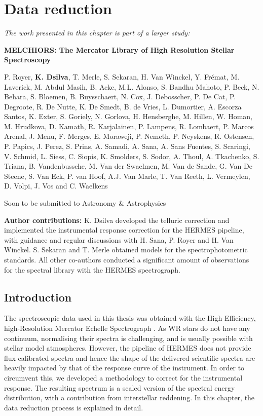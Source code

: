 \chapter{Data reduction} \label{ch:data_reduction}

\textit{The work presented in this chapter is part of a larger study:}

\textbf{MELCHIORS: The Mercator Library of High Resolution Stellar Spectroscopy}

P. Royer, \textbf{K. Dsilva}, T. Merle, S. Sekaran, H. Van Winckel, Y. Fr\'emat, M. Laverick, M. Abdul Masih, B. Acke, M.L. Alonso, S. Bandhu Mahoto, P. Beck, N. Behara, S. Bloemen, B. Buysschaert, N. Cox, J. Debosscher, P. De Cat, P. Degroote, R. De Nutte, K. De Smedt, B. de Vries, L. Dumortier, A. Escorza Santos, K. Exter, S. Goriely, N. Gorlova, H. Hensberghe, M. Hillen, W. Homan, M. Hrudkova, D. Kamath, R. Karjalainen, P. Lampens, R. Lombaert, P. Marcos Arenal, J. Menu, F. Merges, E. Moraweji, P. Nemeth, P. Neyskens, R. Ostensen, P. Papics, J. Perez, S. Prins, A. Samadi, A. Sana, A. Sans Fuentes, S. Scaringi, V. Schmid, L. Siess, C. Siopis, K. Smolders, S. Sodor, A. Thoul, A. Tkachenko, S. Triana, B. Vandenbussche, M. Van der Swaelmen, M. Van de Sande, G. Van De Steene, S. Van Eck, P. van Hoof, A.J. Van Marle, T. Van Reeth, L. Vermeylen, D. Volpi, J. Vos and C. Waelkens

Soon to be submitted to Astronomy \& Astrophysics

\textbf{Author contributions:} K. Dsilva developed the telluric correction and implemented the instrumental response correction for the HERMES pipeline, with guidance and regular discussions with H. Sana, P. Royer and H. Van Winckel. S. Sekaran and T. Merle obtained models for the spectrophotometric standards. All other co-authors conducted a significant amount of observations for the spectral library with the HERMES spectrograph. 

\section{Introduction}

The spectroscopic data used in this thesis was obtained with the High Efficiency, high-Resolution Mercator Echelle Spectrograph \citep[HERMES,][]{raskin_hermes_2011}. As WR stars do not have any continuum, normalising their spectra is challenging, and is usually possible with stellar model atmospheres. However, the pipeline of HERMES does not provide flux-calibrated spectra and hence the shape of the delivered scientific spectra are heavily impacted by that of the response curve of the instrument. In order to circumvent this, we developed a methodology to correct for the instrumental response. The resulting spectrum is a scaled version of the spectral energy distribution, with a contribution from interstellar reddening. In this chapter, the data reduction process is explained in detail. 

